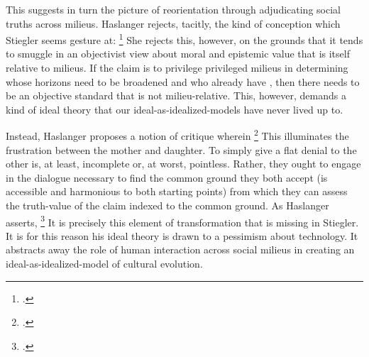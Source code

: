 \documentclass[letterpaper,notitlepage,12pt]{article}
\begin{document}
{This suggests in turn the picture of reorientation through adjudicating social
truths across milieus. Haslanger rejects, tacitly, the kind of conception which
Stiegler seems gesture at: \footcite[p.
81]{haslanger_but_2007}
She rejects this, however, on the grounds that it tends to smuggle in an
objectivist view about moral and epistemic value that is itself relative to
milieus.
If the claim is to privilege privileged milieus in determining whose horizons
need to be broadened and who already have , then there
needs to be an objective standard that is not milieu-relative.
This, however, demands a kind of ideal theory that our ideal-as-idealized-models
have never lived up to.

Instead, Haslanger proposes a notion of critique wherein \footcite[p. 87]{haslanger_but_2007}
This illuminates the frustration between the mother and daughter.
To simply give a flat denial to the other is, at least, incomplete or, at worst,
pointless.
Rather, they ought to engage in the dialogue necessary to find the common ground
they both accept (is accessible and harmonious to both starting points) from
which they can assess the truth-value of the claim indexed to the common ground.
As Haslanger asserts, \footcite[p. 87]{haslanger_but_2007}
It is precisely this element of transformation that is missing in Stiegler.
It is for this reason his ideal theory is drawn to a pessimism about technology.
It abstracts away the role of human interaction across social milieus in
creating an ideal-as-idealized-model of cultural evolution.

}
\end{document}
